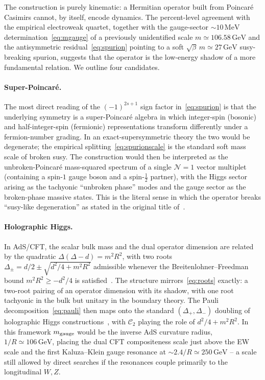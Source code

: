 \documentclass[twocolumn,aps,prd,floatfix,nofootinbib,superscriptaddress,10pt]{article}
\newcommand{\C}{\mathcal{C}}
\newcommand{\GeV}{\,\mathrm{GeV}}
\newcommand{\MeV}{\,\mathrm{MeV}}
\begin{document}
The construction is purely kinematic: a Hermitian operator built from Poincar\'e Casimirs cannot, by itself, encode dynamics. The percent-level agreement with the empirical electroweak quartet, together with the gauge-sector $\sim 10\MeV$ determination~\eqref{eq:mgauge} of a previously unidentified scale $m\simeq 106.58\GeV$ and the antisymmetric residual~\eqref{eq:spurion} pointing to a soft $\sqrt{\beta}\,m\simeq 27\GeV$ susy-breaking spurion, suggests that the operator is the low-energy shadow of a more fundamental relation. We outline four candidates.

\paragraph*{Super-Poincar\'e.} The most direct reading of the $(-1)^{2s+1}$ sign factor in~\eqref{eq:spurion} is that the underlying symmetry is a super-Poincar\'e algebra in which integer-spin (bosonic) and half-integer-spin (fermionic) representations transform differently under a fermion-number grading. In an exact-supersymmetric theory the two would be degenerate; the empirical splitting~\eqref{eq:spurionscale} is the standard soft mass scale of broken susy. The construction would then be interpreted as the unbroken-Poincar\'e mass-squared spectrum of a single $\mathcal{N}=1$ vector multiplet (containing a spin-$1$ gauge boson and a spin-$\tfrac12$ partner), with the Higgs sector arising as the tachyonic ``unbroken phase'' modes and the gauge sector as the broken-phase massive states. This is the literal sense in which the operator breaks ``susy-like degeneration'' as stated in the original title of~\cite{Rivero2006}.

\paragraph*{Holographic Higgs.} In AdS/CFT, the scalar bulk mass and the dual operator dimension are related by the quadratic $\Delta(\Delta-d) = m^2R^2$, with two roots $\Delta_\pm=d/2\pm\sqrt{d^2/4+m^2R^2}$ admissible whenever the Breitenlohner--Freedman bound $m^2R^2\ge -d^2/4$ is satisfied~\cite{BF1982}. The structure mirrors~\eqref{eq:roots} exactly: a two-root pairing of an operator dimension with its shadow, with one root tachyonic in the bulk but unitary in the boundary theory. The Pauli decomposition~\eqref{eq:pauli} then maps onto the standard $(\Delta_+,\Delta_-)$ doubling of holographic Higgs constructions~\cite{KKR}, with $\C_2$ playing the role of $d^2/4+m^2R^2$. In this framework $m_{\rm gauge}$ would be the inverse AdS curvature radius, $1/R\simeq 106\GeV$, placing the dual CFT compositeness scale just above the EW scale and the first Kaluza--Klein gauge resonance at $\sim 2.4/R\simeq 250\GeV$ -- a scale still allowed by direct searches if the resonances couple primarily to the longitudinal $W,Z$.
\end{document}
